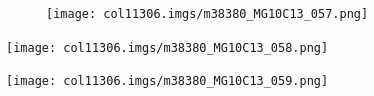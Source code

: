 \begin{enumerate}[noitemsep,
label=\textbf{\arabic*}. ]
\begin{figure}[H]
\begin{center}
\label{m38380*id320271!!!underscore!!!media}\label{
m38380*id320271!!!underscore!!!printimage}\texttt{[image: 
col11306.imgs/m38380\_MG10C13\_057.png]} %
        
    
    \end{center}

 \end{figure}   

    \addtocounter{footnote}{-0}


\label{m38380*id320290!!!underscore!!!media}\label{
m38380*id320290!!!underscore!!!printimage}\texttt{[image: 
col11306.imgs/m38380\_MG10C13\_058.png]} %
        
    




\label{m38380*id320310!!!underscore!!!media}\label{
m38380*id320310!!!underscore!!!printimage}\texttt{[image: 
col11306.imgs/m38380\_MG10C13\_059.png]} %
        
    


        

\end{enumerate}
